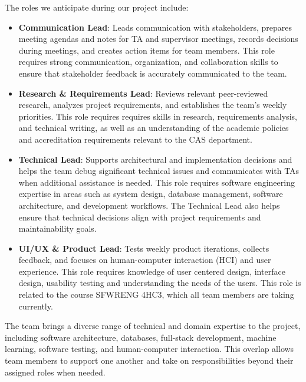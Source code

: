\documentclass{article}
\begin{document}
\bigskip
The roles we anticipate during our project include:
\begin{itemize}
  \item \textbf{Communication Lead}: Leads communication with stakeholders, prepares meeting agendas and notes for TA and supervisor meetings, records decisions during meetings, and creates action items for team members. This role requires strong communication, organization, and collaboration skills to ensure that stakeholder feedback is accurately communicated to the team.
  \item \textbf{Research \& Requirements Lead}: Reviews relevant peer-reviewed research, analyzes project requirements, and establishes the team's weekly priorities. This role requires requires skills in research, requirements analysis, and technical writing, as well as an understanding of the academic policies and accreditation requirements relevant to the CAS department.
  \item \textbf{Technical Lead}: Supports architectural and implementation decisions and helps the team debug significant technical issues and communicates with TAs when additional assistance is needed. This role requires software engineering expertise in areas such as system design, database management, software architecture, and development workflows. The Technical Lead also helps ensure that technical decisions align with project requirements and maintainability goals.
  \item \textbf{UI/UX \& Product Lead}: Tests weekly product iterations, collects feedback, and focuses on human-computer interaction (HCI) and user experience. This role requires knowledge of user centered design, interface design, usability testing and understanding the needs of the users. This role is related to the course SFWRENG 4HC3, which all team members are taking currently.
\end{itemize}

The team brings a diverse range of technical and domain expertise to the project, including software architecture, databases, full-stack development, machine learning, software testing, and human-computer interaction. This overlap allows team members to support one another and take on responsibilities beyond their assigned roles when needed.
\end{document}
